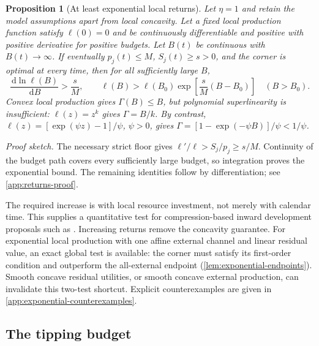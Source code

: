 \documentclass[11pt,a4paper]{article}
\newtheorem{proposition}{Proposition}
\theoremstyle{definition}\newtheorem{definition}{Definition}
\newcommand{\dd}{\,\mathrm{d}}
\begin{document}
\begin{proposition}[At least exponential local returns]
\label{prop:exponential-necessity}
Let $\eta=1$ and retain the model assumptions apart from local
concavity. Let a fixed local production function satisfy $\ell(0)=0$
and be continuously differentiable and positive with positive derivative
for positive budgets. Let $B(t)$ be continuous with $B(t)\to\infty$.
If eventually $p_j(t)\leq M$, $S_j(t)\geq s>0$, and the corner is
optimal at every time, then for all sufficiently large $B$,
\begin{equation}
 \frac{\dd\ln\ell(B)}{\dd B}>\frac{s}{M},\qquad
 \ell(B)>\ell(B_0)\exp\!\left[\frac{s}{M}(B-B_0)\right]
 \quad(B>B_0).
 \label{eq:exponential-necessity}
\end{equation}
Convex local production gives $\Gamma(B)\leq B$, but polynomial
superlinearity is insufficient: $\ell(z)=z^k$ gives $\Gamma=B/k$.
By contrast, $\ell(z)=[\exp(\psi z)-1]/\psi$, $\psi>0$, gives
$\Gamma=[1-\exp(-\psi B)]/\psi<1/\psi$.
\end{proposition}
\noindent\emph{Proof sketch.}
The necessary strict floor gives $\ell'/\ell>S_j/p_j\geq s/M$.
Continuity of the budget path covers every sufficiently large budget,
so integration proves the exponential bound. The remaining identities
follow by differentiation; see \cref{app:returns-proof}.

The required increase is with local resource investment, not merely
with calendar time. This supplies a quantitative test for
compression-based inward development proposals such as
\citet{Smart2012}. Increasing returns remove the concavity guarantee.
For exponential local production with one affine external channel and
linear residual value, an exact global test is available: the corner
must satisfy its first-order condition and outperform the all-external
endpoint (\cref{lem:exponential-endpoints}). Smooth concave residual
utilities, or smooth concave external production, can invalidate this
two-test shortcut. Explicit counterexamples are given in
\cref{app:exponential-counterexamples}.

\subsection{The tipping budget}
\end{document}
